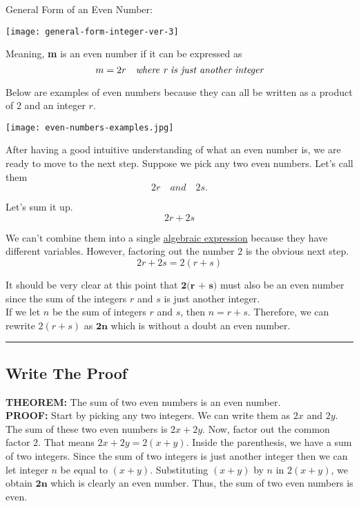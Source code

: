 \documentclass{article}
\begin{document}
General Form of an Even Number:
\begin{center}
    \texttt{[image: general-form-integer-ver-3]}
\end{center}

Meaning, \textbf{m} is an even number if it can be expressed as
\begin{equation*}
    m = 2r \quad \emph{where r is just another integer} %
\end{equation*}

Below are examples of even numbers because they can all be written as a product of 2 and an integer $r$.
\begin{center}
    \texttt{[image: even-numbers-examples.jpg]}
\end{center}

After having a good intuitive understanding of what an even number is, we are ready to move to the next step. Suppose we pick any two even numbers. Let's call them \\
\begin{equation*}
    2r \quad and \quad 2s.
\end{equation*}

Let's sum it up.
\begin{equation*}
    2r + 2s
\end{equation*}

We can't combine them into a single \underline{algebraic expression} because they have different variables. However, factoring out the number $2$ is the obvious next step.
\begin{equation*}
    2r + 2s = 2(r + s)
\end{equation*}

It should be very clear at this point that $\textbf{2(r + s)}$ must also be an even number since the sum of the integers $r$ and $s$ is just another integer. \\

If we let $n$ be the sum of integers $r$ and $s$, then $n = r + s$. Therefore, we can rewrite $2(r + s)$ as $\textbf{2n}$ which is without a doubt an even number.

\vspace{1em} \hrule

\subsection{Write The Proof}

\textbf{THEOREM:} The sum of two even numbers is an even number. \\

\noindent \textbf{PROOF:} Start by picking any two integers. We can write them as $2x$ and $2y$. The sum of these two even numbers is $2x + 2y$. Now, factor out the common factor $2$. That means $2x + 2y = 2(x + y)$. Inside the parenthesis, we have a sum of two integers. Since the sum of two integers is just another integer then we can let integer $n$ be equal to $(x + y)$. Substituting $(x + y)$ by $n$ in $2(x + y)$, we obtain $\textbf{2n}$ which is clearly an even number. Thus, the sum of two even numbers is even. %

\end{document}
